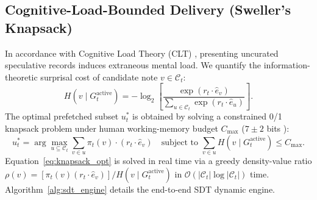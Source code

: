 \documentclass[ijds,dblanonrev]{informs4}
\begin{document}
\subsection{Cognitive-Load-Bounded Delivery (Sweller's Knapsack)}
In accordance with Cognitive Load Theory (CLT) \citep{sweller1988cognitive}, presenting uncurated speculative records induces extraneous mental load. We quantify the information-theoretic surprisal cost of candidate note $v \in \mathcal{C}_t$:
\begin{equation}
  H(v \mid G_t^{\text{active}}) = -\log_2 \left[ \frac{\exp(r_t \cdot \hat{e}_v)}{\sum_{u \in \mathcal{C}_t} \exp(r_t \cdot \hat{e}_u)} \right].
  \label{eq:surprisal_cost}
\end{equation}
The optimal prefetched subset $u_t^*$ is obtained by solving a constrained 0/1 knapsack problem under human working-memory budget $C_{\max}$ ($7 \pm 2$ bits \citep{miller1956magical}):
\begin{equation}
  u_t^* = \arg\max_{u \subseteq \mathcal{C}_t} \sum_{v \in u} \pi_t(v) \cdot (r_t \cdot \hat{e}_v) \quad \text{subject to } \sum_{v \in u} H(v \mid G_t^{\text{active}}) \le C_{\max}.
  \label{eq:knapsack_opt}
\end{equation}
Equation~\eqref{eq:knapsack_opt} is solved in real time via a greedy density-value ratio $\rho(v) = [\pi_t(v)(r_t \cdot \hat{e}_v)] / H(v \mid G_t^{\text{active}})$ in $\mathcal{O}(|\mathcal{C}_t| \log |\mathcal{C}_t|)$ time. Algorithm~\ref{alg:sdt_engine} details the end-to-end SDT dynamic engine.
\end{document}

